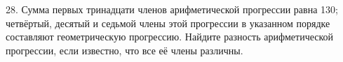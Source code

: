 28. Сумма первых тринадцати членов арифметической прогрессии равна 130; четвёртый, десятый и седьмой члены этой прогрессии в указанном порядке составляют геометрическую прогрессию. Найдите разность арифметической прогрессии, если известно, что все её члены различны.\\
